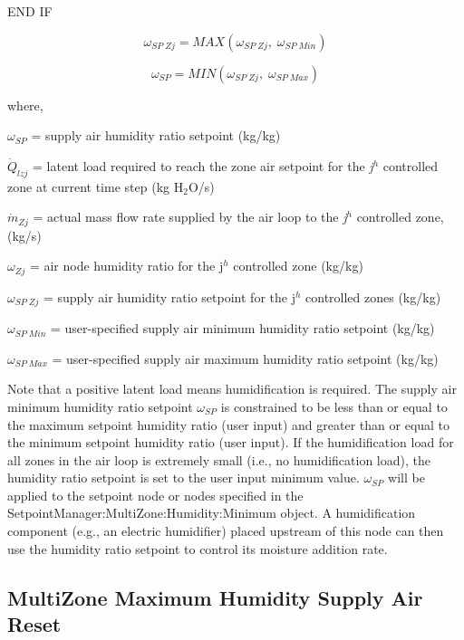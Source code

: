 END IF

\begin{equation}
{\omega_{SP\;Zj}} = MAX\left( {{\omega_{SP\;Zj}},\;{\omega_{SP\;Min}}} \right)
\end{equation}

\begin{equation}
{\omega_{SP}} = MIN\left( {{\omega_{SP\;Zj}},\;{\omega_{SP\;Max}}} \right)
\end{equation}

where,

\({\omega_{SP}}\) = supply air humidity ratio setpoint (kg/kg)

\({\dot Q_{lzj}}\) = latent load required to reach the zone air setpoint for the \emph{j}\(^{h}\) controlled zone at current time step (kg H\(_{2}\)O/s)

\({\dot m_{Zj}}\) = actual mass flow rate supplied by the air loop to the \emph{j}\(^{h}\) controlled zone, (kg/s)

\({\omega_{Zj}}\) = air node humidity ratio for the j\(^{h}\) controlled zone (kg/kg)

\({\omega_{SP\;Zj}}\) = supply air humidity ratio setpoint for the j\(^{h}\) controlled zones (kg/kg)

\({\omega_{SP\;Min}}\) = user-specified supply air minimum humidity ratio setpoint (kg/kg)

\({\omega_{SP\;Max}}\) = user-specified supply air maximum humidity ratio setpoint (kg/kg)

Note that a positive latent load means humidification is required. The supply air minimum humidity ratio setpoint \({\omega_{SP}}\) is constrained to be less than or equal to the maximum setpoint humidity ratio (user input) and greater than or equal to the minimum setpoint humidity ratio (user input). If the humidification load for all zones in the air loop is extremely small (i.e., no humidification load), the humidity ratio setpoint is set to the user input minimum value. \({\omega_{SP}}\) will be applied to the setpoint node or nodes specified in the SetpointManager:MultiZone:Humidity:Minimum object. A humidification component (e.g., an electric humidifier) placed upstream of this node can then use the humidity ratio setpoint to control its moisture addition rate.

\subsection{MultiZone Maximum Humidity Supply Air Reset}\label{multizone-maximum-humidity-supply-air-reset}


